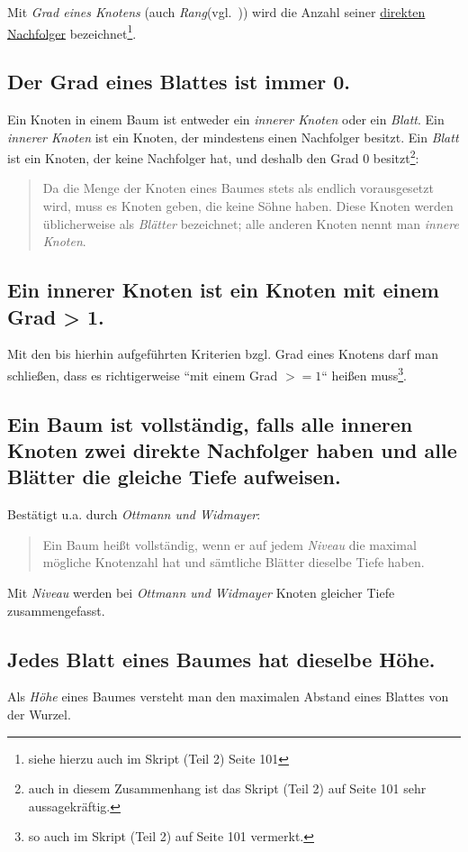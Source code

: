 Mit \textit{Grad eines Knotens} (auch \textit{Rang}(vgl.~\cite[260]{OW17e})) wird die Anzahl seiner \underline{direkten Nachfolger} bezeichnet\footnote{siehe hierzu auch im Skript (Teil 2) Seite 101}.

\subsection*{Der Grad eines Blattes ist immer 0.}

Ein Knoten in einem Baum ist entweder ein \textit{innerer Knoten} oder ein \textit{Blatt}.
Ein \textit{innerer Knoten} ist ein Knoten, der mindestens einen Nachfolger besitzt.
Ein \textit{Blatt} ist ein Knoten, der keine Nachfolger hat, und deshalb den Grad $0$ besitzt\footnote{
auch in diesem Zusammenhang ist das Skript (Teil 2) auf Seite 101 sehr aussagekräftig.
}:

\blockquote[{\cite[259, Hervorhebungen i.O.]{OW17e}}]{
    Da die Menge der Knoten eines Baumes stets als endlich vorausgesetzt wird, muss es
    Knoten geben, die keine Söhne haben. Diese Knoten werden üblicherweise als \textit{Blätter}
    bezeichnet; alle anderen Knoten nennt man \textit{innere Knoten}.
}

\subsection*{Ein innerer Knoten ist ein Knoten mit einem Grad > 1.}
Mit den bis hierhin aufgeführten Kriterien {bzgl.} Grad eines Knotens darf man schließen, dass es richtigerweise ``mit einem Grad $>= 1$`` heißen muss\footnote{
    so auch im Skript (Teil 2) auf Seite 101 vermerkt.
}.


\subsection*{Ein Baum ist vollständig, falls alle inneren Knoten zwei direkte Nachfolger haben und alle Blätter die gleiche Tiefe aufweisen.}

Bestätigt u.a. durch \textit{Ottmann und Widmayer}:

\blockquote[{\cite[261, Hervorhebungen i.O.]{OW17e}}]{
    Ein Baum heißt vollständig, wenn er auf jedem \textit{Niveau} die maximal mögliche Knotenzahl hat und sämtliche Blätter dieselbe Tiefe haben.
}

Mit \textit{Niveau} werden bei \textit{Ottmann und Widmayer} Knoten gleicher Tiefe zusammengefasst.


\subsection*{Jedes Blatt eines Baumes hat dieselbe Höhe.}
Als \textit{Höhe} eines Baumes versteht man den maximalen Abstand eines Blattes von der Wurzel.

